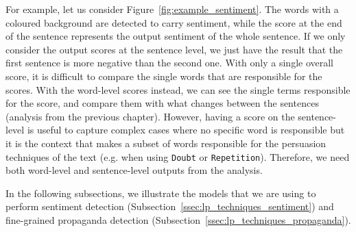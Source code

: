 For example, let us consider Figure~\ref{fig:example_sentiment}.
The words with a coloured background are detected to carry sentiment, while the score at the end of the sentence represents the output sentiment of the whole sentence.
If we only consider the output scores at the sentence level, we just have the result that the first sentence is more negative than the second one. With only a single overall score, it is difficult to compare the single words that are responsible for the scores.
With the word-level scores instead, we can see the single terms responsible for the score, and compare them with what changes between the sentences (analysis from the previous chapter).
However, having a score on the sentence-level is useful to capture complex cases where no specific word is responsible but it is the context that makes a subset of words responsible for the persuasion techniques of the text (e.g. when using \texttt{Doubt} or \texttt{Repetition}).
Therefore, we need both word-level and sentence-level outputs from the analysis.

In the following subsections, we illustrate the models that we are using to perform sentiment detection (Subsection~\ref{ssec:lp_techniques_sentiment}) and fine-grained propaganda detection (Subsection~\ref{ssec:lp_techniques_propaganda}).


